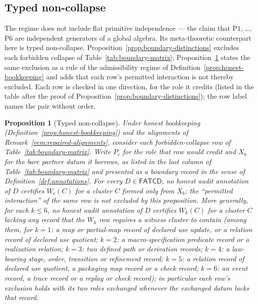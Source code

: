 \documentclass[11pt]{article}
\newtheorem{proposition}[theorem]{Proposition}
\theoremstyle{definition}
\newcommand{\FATCD}{\ensuremath{\mathsf{FATCD}}}
\newcommand{\Pone}{\ensuremath{\mathrm{P1}}}
\newcommand{\Psix}{\ensuremath{\mathrm{P6}}}
\begin{document}
\subsection{Typed non-collapse}\label{subsec:typed-non-collapse}

The regime does not include flat primitive independence --- the claim
that \Pone{}, \ldots, \Psix{} are independent generators of a global
algebra. Its meta-theoretic counterpart here is typed non-collapse.
Proposition~\ref{prop:boundary-distinctions} excludes each forbidden collapse
of Table~\ref{tab:boundary-matrix}; Proposition~\ref{prop:typed-non-collapse}
states the same exclusion as a rule of the admissibility regime of
Definition~\ref{prop:honest-bookkeeping} and adds that each row's permitted
interaction is not thereby excluded. Each row is checked in one direction, for the role it credits (listed in the
table after the proof of Proposition~\ref{prop:boundary-distinctions}); the
row label names the pair without order.

\begin{proposition}[Typed non-collapse]\label{prop:typed-non-collapse}
Under honest bookkeeping (Definition~\ref{prop:honest-bookkeeping}) and
the alignments of Remark~\ref{rem:repaired-alignments}, consider each
forbidden-collapse row of Table~\ref{tab:boundary-matrix}. Write \(P_c\)
for the role that row would credit and \(X_b\) for the bare partner datum
it borrows, as listed in the last column of Table~\ref{tab:boundary-matrix}
and presented as a boundary record in the sense of
Definition~\ref{def:annotations}.
For every \(D\in\FATCD{}\), no honest audit annotation of \(D\)
certifies \(W_c(C)\) for a cluster \(C\) formed only from \(X_b\); the ``permitted interaction'' of the same row is
not excluded by this proposition. More generally, for each \(k\le6\), no
honest audit annotation of \(D\) certifies \(W_k(C)\) for a cluster \(C\)
lacking any record that the \(W_k\) row requires a witness cluster to contain (among them, for \(k=1\): a map or partial-map record of declared use update, or a relation record of declared use quotient; \(k=2\): a macro-specification predicate record or a realization relation; \(k=3\): two defined path or derivation records; \(k=4\): a law-bearing stage, order, transition or refinement record; \(k=5\): a relation record of declared use quotient, a packaging map record or a check record; \(k=6\): an event record, a trace record or a replay or check record); in particular each row's exclusion holds with its two
roles exchanged whenever the exchanged datum lacks that record.
\end{proposition}
\end{document}

